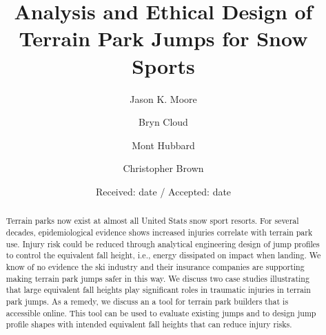 \documentclass[smallextended]{svjour3}       %
\begin{document}
\title{Analysis and Ethical Design of Terrain Park Jumps for Snow Sports}

\author{Jason K. Moore      \and
        Bryn Cloud          \and
        Mont Hubbard        \and
        Christopher Brown
}



\date{Received: date / Accepted: date}

\maketitle

\begin{abstract}
  Terrain parks now exist at almost all United Stats snow sport resorts. For
  several decades, epidemiological evidence shows increased injuries correlate
  with terrain park use. Injury risk could be reduced through analytical
  engineering design of jump profiles to control the equivalent fall height,
  i.e., energy dissipated on impact when landing. We know of no evidence the
  ski industry and their insurance companies are supporting making terrain park
  jumps safer in this way. We discuss two case studies illustrating that large
  equivalent fall heights play significant roles in traumatic injuries in
  terrain park jumps. As a remedy, we discuss an a tool for
  terrain park builders that is accessible online. This tool can be used to evaluate existing jumps and to design jump profile shapes with intended equivalent fall heights that can reduce injury risks.
\end{abstract}
\end{document}
